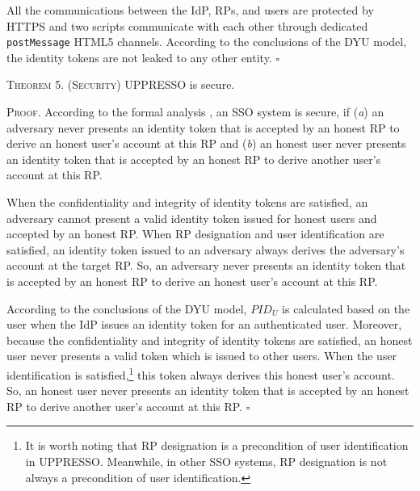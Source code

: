 {All the communications between the IdP, RPs, and users are protected by HTTPS
 and two scripts communicate with each other through dedicated \verb+postMessage+ HTML5 channels.
According to the conclusions of the DYU model,
 the identity tokens are not leaked to any other entity. \hfill $\square$


\vspace{1mm}
\noindent\textsc{Theorem 5. (Security)} {UPPRESSO is secure.}

\vspace{0.75mm}
\noindent\textsc{Proof.}
According to the formal analysis \cite{SPRESSO,FettKS14},
    an SSO system is secure, if (\emph{a}) an adversary never presents an identity token that is accepted by an honest RP to derive an honest user's account at this RP
    and (\emph{b}) an honest user never presents an identity token that is accepted by an honest RP to derive another user's account at this RP.


When the confidentiality and integrity of identity tokens are satisfied, an adversary cannot present a valid identity token issued for honest users and accepted by an honest RP.
When RP designation and user identification are satisfied, an identity token issued to an adversary always derives the adversary's account at the target RP.
So, an adversary never presents an identity token that is accepted by an honest RP to derive an honest user's account at this RP.


According to the conclusions of the DYU model, $PID_U$ is calculated based on the user when the IdP issues an identity token for an authenticated user.
Moreover, because the confidentiality and integrity of identity tokens are satisfied, an honest user never presents a valid token which is issued to other users.
When the user identification is satisfied,\footnote{It is worth noting that RP designation is a precondition of user identification in UPPRESSO. Meanwhile, in other SSO systems, RP designation is not always a precondition of user identification.} this token always derives this honest user's account.
So, an honest user never presents an identity token that is accepted by an honest RP to derive another user’s account at this RP.
\hfill $\square$

}
